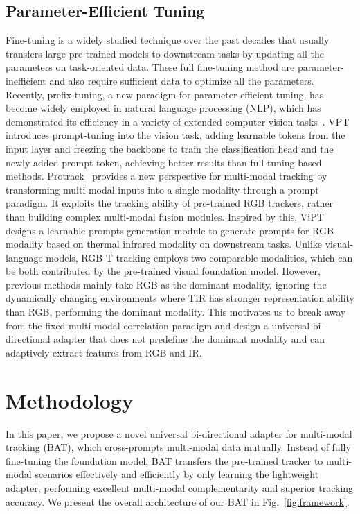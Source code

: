 \documentclass[letterpaper]{article} %
\begin{document}
\subsection{Parameter-Efficient Tuning}
Fine-tuning is a widely studied technique over the past decades that usually transfers large pre-trained models to downstream tasks by updating all the parameters on task-oriented data.
These full fine-tuning method are parameter-inefficient and also require sufficient data to optimize all the parameters.
Recently, prefix-tuning, a new paradigm for parameter-efficient tuning, has become widely employed in natural language processing (NLP), which has demonstrated its efficiency in a variety of extended computer vision tasks~\cite{khattak2023maple}.
VPT~\cite{jia2022visual} introduces prompt-tuning into the vision task, adding learnable tokens from the input layer and freezing the backbone to train the classification head and the newly added prompt token, achieving better results than full-tuning-based methods. 
Protrack~\cite{ProTrack} provides a new perspective for multi-modal tracking by transforming multi-modal inputs into a single modality through a prompt paradigm. It exploits the tracking ability of pre-trained RGB trackers, rather than building complex multi-modal fusion modules.
Inspired by this, ViPT~\cite{zhu2023visual} designs a learnable prompts generation module to generate prompts for RGB modality based on thermal infrared modality on downstream tasks.
Unlike visual-language models, RGB-T tracking employs two comparable modalities, which can be both contributed by the pre-trained visual foundation model. However, previous methods mainly take RGB as the dominant modality, ignoring the dynamically changing environments where TIR has stronger representation ability than RGB, performing the dominant modality. 
This motivates us to break away from the fixed multi-modal correlation paradigm and design a universal bi-directional adapter that does not predefine the dominant modality and can adaptively extract features from RGB and IR.



\section{Methodology}
In this paper, we propose a novel universal bi-directional adapter for multi-modal tracking (BAT), which cross-prompts multi-modal data mutually. 
Instead of fully fine-tuning the foundation model, BAT transfers the pre-trained tracker to multi-modal scenarios effectively and efficiently by only learning the lightweight adapter, performing excellent multi-modal complementarity and superior tracking accuracy.
We present the overall architecture of our BAT in Fig.~\ref{fig:framework}.
\end{document}
